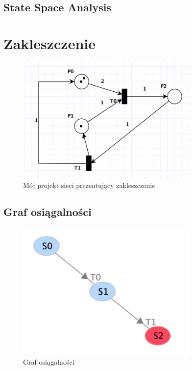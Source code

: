 \documentclass{article}
\begin{document}
\subsection{State Space Analysis}

\section{Zakleszczenie}
\begin{figure}[H]
    \centering
    \includegraphics[width=0.8\textwidth, height=0.4\textheight]{zad7.png}
    \caption{Mój projekt sieci prezentujący zakleszczenie}
\end{figure}

\subsection{Graf osiągalności}
\begin{figure}[H]
    \centering
    \includegraphics[width=0.8\textwidth, height=0.4\textheight]{zad7_graph.png}
    \caption{Graf osiągalności}
\end{figure}
\end{document}
